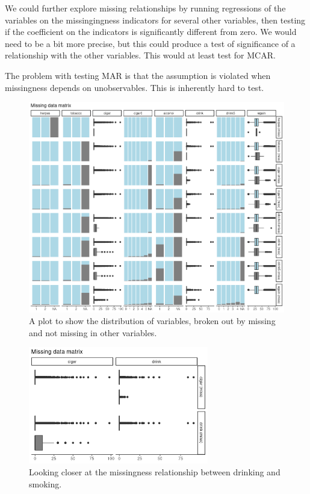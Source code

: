 \documentclass[12pt]{article}
\begin{document}
We could further explore missing relationships by running regressions of the variables on the missingingness indicators for several other variables, then testing if the coefficient on the indicators is significantly different from zero. We would need to be a bit more precise, but this could produce a test of significance of a relationship with the other variables. This would at least test for MCAR. 

The problem with testing MAR is that the assumption is violated when missingness depends on unobservables. This is inherently hard to test.

\begin{figure}[!ht]
\centering
\includegraphics[width=\textwidth]{2b-missing_plots.png}
\caption{A plot to show the distribution of variables, broken out by missing and not missing in other variables.}
\label{fig-2b1}
\end{figure}

\begin{figure}[!ht]
\centering
\includegraphics[width=0.7\textwidth]{2b-missing_plots_cigar-vs-drink.png}
\caption{Looking closer at the missingness relationship between drinking and smoking.}
\label{fig-2b2}
\end{figure}
\FloatBarrier
\end{document}
